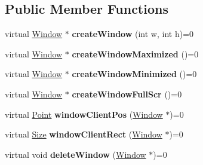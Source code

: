 \subsection*{Public Member Functions}
\begin{DoxyCompactItemize}
\item 
\hypertarget{class_tempest_1_1_system_a_p_i_ab39e102421108c800806cc672f65c79b}{virtual \hyperlink{class_tempest_1_1_window}{Window} $\ast$ {\bfseries create\+Window} (int w, int h)=0}\label{class_tempest_1_1_system_a_p_i_ab39e102421108c800806cc672f65c79b}

\item 
\hypertarget{class_tempest_1_1_system_a_p_i_a85d49237cf8f955243fcb30451224b6b}{virtual \hyperlink{class_tempest_1_1_window}{Window} $\ast$ {\bfseries create\+Window\+Maximized} ()=0}\label{class_tempest_1_1_system_a_p_i_a85d49237cf8f955243fcb30451224b6b}

\item 
\hypertarget{class_tempest_1_1_system_a_p_i_a9649f811bf19b57050557677ff55af72}{virtual \hyperlink{class_tempest_1_1_window}{Window} $\ast$ {\bfseries create\+Window\+Minimized} ()=0}\label{class_tempest_1_1_system_a_p_i_a9649f811bf19b57050557677ff55af72}

\item 
\hypertarget{class_tempest_1_1_system_a_p_i_aaf66aabd9a3cfd132def594db7b898cd}{virtual \hyperlink{class_tempest_1_1_window}{Window} $\ast$ {\bfseries create\+Window\+Full\+Scr} ()=0}\label{class_tempest_1_1_system_a_p_i_aaf66aabd9a3cfd132def594db7b898cd}

\item 
\hypertarget{class_tempest_1_1_system_a_p_i_a7ca6b18921ca53532d614f22c8ea2701}{virtual \hyperlink{struct_tempest_1_1_point}{Point} {\bfseries window\+Client\+Pos} (\hyperlink{class_tempest_1_1_window}{Window} $\ast$)=0}\label{class_tempest_1_1_system_a_p_i_a7ca6b18921ca53532d614f22c8ea2701}

\item 
\hypertarget{class_tempest_1_1_system_a_p_i_a832f23a315ed664ad5000c804a915703}{virtual \hyperlink{struct_tempest_1_1_size}{Size} {\bfseries window\+Client\+Rect} (\hyperlink{class_tempest_1_1_window}{Window} $\ast$)=0}\label{class_tempest_1_1_system_a_p_i_a832f23a315ed664ad5000c804a915703}

\item 
\hypertarget{class_tempest_1_1_system_a_p_i_a8d9b0e112eaee23c4e386653eff22c1b}{virtual void {\bfseries delete\+Window} (\hyperlink{class_tempest_1_1_window}{Window} $\ast$)=0}\label{class_tempest_1_1_system_a_p_i_a8d9b0e112eaee23c4e386653eff22c1b}


\end{DoxyCompactItemize}
